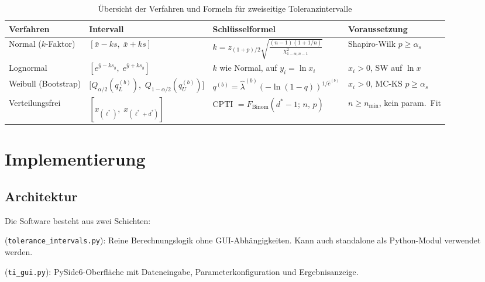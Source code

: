 \documentclass[10pt,a4paper,twocolumn]{article}
\theoremstyle{definition}
\newcommand{\xbar}{\bar{x}}
\begin{document}
\begin{table}[t]
\centering
\caption{Übersicht der Verfahren und Formeln für zweiseitige Toleranzintervalle}
\label{tab:formeln}
\small
\begin{tabular}{@{}p{2.8cm}p{3.5cm}p{4.5cm}p{3.5cm}@{}}
\toprule
\textbf{Verfahren} & \textbf{Intervall} & \textbf{Schlüsselformel} & \textbf{Voraussetzung} \\
\midrule
Normal ($k$-Faktor)
    & $[\xbar - ks,\; \xbar + ks]$
    & $k = z_{(1+p)/2}\sqrt{\frac{(n-1)(1+1/n)}{\chi^2_{1-\alpha,n-1}}}$
    & Shapiro-Wilk $p \geq \alpha_s$ \\[4pt]
Lognormal
    & $[e^{\bar{y}-ks_y},\; e^{\bar{y}+ks_y}]$
    & $k$ wie Normal, auf $y_i = \ln x_i$
    & $x_i > 0$, SW auf $\ln x$ \\[4pt]
Weibull (Bootstrap)
    & $[Q_{\alpha/2}(q_L^{(b)}),$ $Q_{1-\alpha/2}(q_U^{(b)})]$
    & $q^{(b)} = \hat\lambda^{(b)}(-\ln(1-q))^{1/\hat c^{(b)}}$
    & $x_i > 0$, MC-KS $p \geq \alpha_s$ \\[4pt]
Verteilungsfrei
    & $[x_{(\ell^*)},\; x_{(\ell^*+d^*)}]$
    & CPTI $= F_{\text{Binom}}(d^*{-}1;\,n,\,p)$
    & $n \geq n_{\min}$, kein param.\ Fit \\
\bottomrule
\end{tabular}
\end{table}


\section{Implementierung}
\label{sec:implementierung}

\subsection{Architektur}

Die Software besteht aus zwei Schichten:

\begin{description}[nosep,leftmargin=*,font=\bfseries]
    \item[Rechenkern] (\texttt{tolerance\_intervals.py}):
        Reine Berechnungslogik ohne GUI-Abhängigkeiten.
        Kann auch standalone als Python-Modul verwendet werden.
    \item[GUI] (\texttt{ti\_gui.py}):
        PySide6-Oberfläche mit Dateneingabe, Parameterkonfiguration
        und Ergebnisanzeige.
\end{description}
\end{document}
